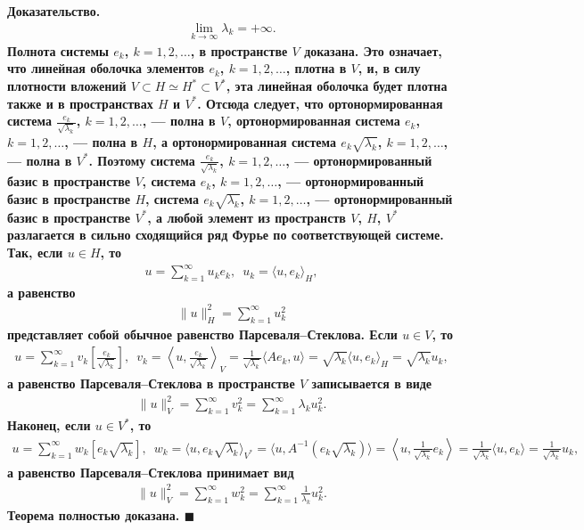 \documentclass{report}
\newenvironment{Proof}{\par\noindent\bf Доказательство.\rm}{ $\blacksquare$\par}
\begin{document}
\begin{Proof}
\begin{gather*}
\lim\limits_{k\to\infty}\lambda_k=+\infty.
\end{gather*}
Полнота системы $e_k$, $k=1,2,\dots$, в пространстве $V$ доказана. Это означает, что линейная оболочка элементов $e_k$, $k=1,2,\dots$, плотна в $V$, и, в силу плотности вложений
$V\subset H\simeq H^*\subset V^*$, эта линейная оболочка будет плотна также и в пространствах $H$ и $V^*$. Отсюда следует, что ортонормированная система $\frac{e_k}{\sqrt{\lambda_k}}$,
$k=1,2,\dots$, --- полна в $V$, ортонормированная система $e_k$, $k=1,2,\dots$, --- полна в $H$, а ортонормированная система ${e_k}{\sqrt{\lambda_k}}$, $k=1,2,\dots$, --- полна в $V^*$.
Поэтому система $\frac{e_k}{\sqrt{\lambda_k}}$, $k=1,2,\dots$, --- ортонормированный базис в пространстве $V$, система $e_k$, $k=1,2,\dots$, --- ортонормированный базис в пространстве $H$,
система ${e_k}{\sqrt{\lambda_k}}$, $k=1,2,\dots$, --- ортонормированный базис в пространстве $V^*$, а любой элемент из пространств $V$, $H$, $V^*$ разлагается в сильно сходящийся ряд Фурье
по соответствующей системе. Так, если $u\in H$, то
\begin{gather*}
u=\sum\limits_{k=1}^\infty u_ke_k,\,\,\,u_k=\langle u,e_k\rangle_H,
\end{gather*}
а равенство
\begin{gather*}
\|u\|^2_H=\sum\limits_{k=1}^\infty u^2_k
\end{gather*}
представляет собой обычное равенство Парсеваля--Стеклова. Если $u\in V$, то
\begin{gather*}
u=\sum\limits_{k=1}^\infty v_k\left[\frac{e_k}{\sqrt{\lambda_k}}\right],\,\,\,
v_k=\left\langle u,\frac{e_k}{\sqrt{\lambda_k}}\right\rangle_V=\frac1{\sqrt{\lambda_k}}\langle Ae_k,u\rangle=\sqrt{\lambda_k}\langle u,e_k\rangle_H=\sqrt{\lambda_k}u_k,
\end{gather*}
а равенство Парсеваля--Стеклова в пространстве $V$ записывается в виде
\begin{gather*}
\|u\|^2_V=\sum\limits_{k=1}^\infty v^2_k=\sum\limits_{k=1}^\infty\lambda_ku_k^2.
\end{gather*}
Наконец, если $u\in V^*$, то
\begin{gather*}
u=\sum\limits_{k=1}^\infty w_k[e_k\sqrt{\lambda_k}],\,\,\,
w_k=\langle u,e_k\sqrt{\lambda_k}\rangle_{V^*}=\langle u,A^{-1}(e_k\sqrt{\lambda_k})\rangle=\left\langle u,\frac1{\sqrt{\lambda_k}}e_k\right\rangle=\frac1{\sqrt{\lambda_k}}
\langle u,e_k\rangle=\frac1{\sqrt{\lambda_k}}u_k,
\end{gather*}
а равенство Парсеваля--Стеклова принимает вид
\begin{gather*}
\|u\|^2_V=\sum\limits_{k=1}^\infty w^2_k=\sum\limits_{k=1}^\infty\frac1{\lambda_k}u^2_k.
\end{gather*}
Теорема полностью доказана.
\end{Proof}
\end{document}
